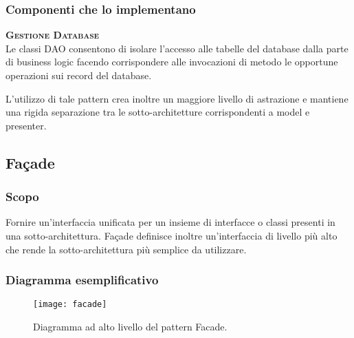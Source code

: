\subsubsection{Componenti che lo implementano}
\begin{description}
\item{\scshape\bfseries Gestione Database}\\
Le classi DAO consentono di isolare l'accesso alle tabelle del database dalla parte di business logic facendo corrispondere alle invocazioni di metodo le opportune operazioni sui record del database.

L'utilizzo di tale pattern crea inoltre un maggiore livello di astrazione e mantiene una rigida separazione tra le sotto-architetture corrispondenti a model e presenter.
\end{description}

\subsection{Façade}

\subsubsection{Scopo}
Fornire un'interfaccia unificata per un insieme di interfacce o classi presenti in una sotto-architettura. Façade definisce inoltre un'interfaccia di livello più alto che rende la sotto-architettura più semplice da utilizzare.

\subsubsection{Diagramma esemplificativo}
\begin{figure}[H]
\centering
\texttt{[image: facade]}
\caption{Diagramma ad alto livello del pattern Facade.}\label{fig:facade}
\end{figure}

